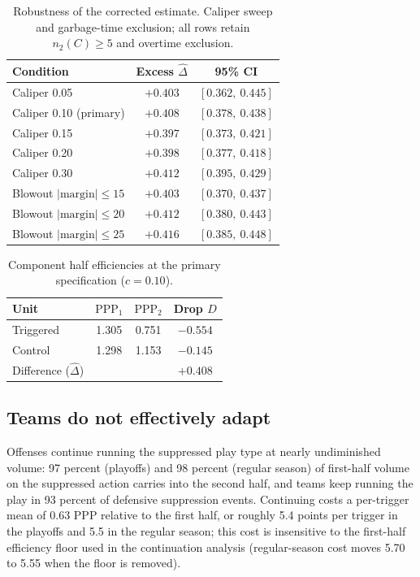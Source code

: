 \documentclass[11pt]{article}
\begin{document}
\begin{table}[t]
\centering
\caption{Robustness of the corrected estimate. Caliper sweep and garbage-time exclusion; all rows retain $n_2(C)\geq5$ and overtime exclusion.}
\label{tab:robustness}
\begin{tabular}{lcc}
\toprule
Condition & Excess $\hat{\Delta}$ & 95\% CI \\
\midrule
Caliper 0.05                    & $+0.403$ & $[0.362,\ 0.445]$ \\
Caliper 0.10 (primary)          & $+0.408$ & $[0.378,\ 0.438]$ \\
Caliper 0.15                    & $+0.397$ & $[0.373,\ 0.421]$ \\
Caliper 0.20                    & $+0.398$ & $[0.377,\ 0.418]$ \\
Caliper 0.30                    & $+0.412$ & $[0.395,\ 0.429]$ \\
\midrule
Blowout $|\text{margin}|\leq15$ & $+0.403$ & $[0.370,\ 0.437]$ \\
Blowout $|\text{margin}|\leq20$ & $+0.412$ & $[0.380,\ 0.443]$ \\
Blowout $|\text{margin}|\leq25$ & $+0.416$ & $[0.385,\ 0.448]$ \\
\bottomrule
\end{tabular}
\end{table}

\begin{table}[t]
\centering
\caption{Component half efficiencies at the primary specification ($c=0.10$).}
\label{tab:components}
\begin{tabular}{lccc}
\toprule
Unit & $\mathrm{PPP}_1$ & $\mathrm{PPP}_2$ & Drop $D$ \\
\midrule
Triggered & 1.305 & 0.751 & $-0.554$ \\
Control & 1.298 & 1.153 & $-0.145$ \\
Difference ($\hat{\Delta}$) & & & $+0.408$ \\
\bottomrule
\end{tabular}
\end{table}

\subsection{Teams do not effectively adapt}

Offenses continue running the suppressed play type at nearly undiminished volume: 97 percent (playoffs) and 98 percent (regular season) of first-half volume on the suppressed action carries into the second half, and teams keep running the play in 93 percent of defensive suppression events. Continuing costs a per-trigger mean of 0.63 PPP relative to the first half, or roughly 5.4 points per trigger in the playoffs and 5.5 in the regular season; this cost is insensitive to the first-half efficiency floor used in the continuation analysis (regular-season cost moves 5.70 to 5.55 when the floor is removed).
\end{document}
